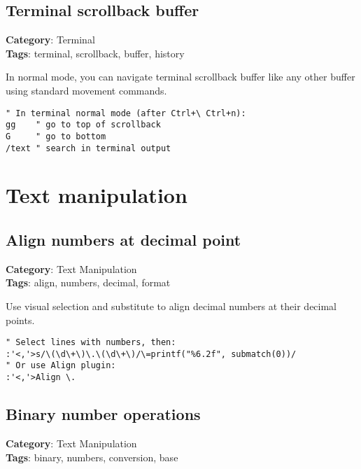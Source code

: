 {{{{{{{{{{{{{\section{Terminal scrollback buffer}

\textbf{Category}: Terminal\\ \textbf{Tags}: terminal, scrollback, buffer, history
\vspace{0.5cm}

In normal mode, you can navigate terminal scrollback buffer like any other buffer using standard movement commands.

\begin{Exa*}{}
\begin{Verbatim}[fontsize=\footnotesize, breaklines, breakanywhere]
" In terminal normal mode (after Ctrl+\ Ctrl+n):
gg    " go to top of scrollback
G     " go to bottom  
/text " search in terminal output
\end{Verbatim}
\end{Exa*}

\chapter{Text manipulation}
\section{Align numbers at decimal point}

\textbf{Category}: Text Manipulation\\ \textbf{Tags}: align, numbers, decimal, format
\vspace{0.5cm}

Use visual selection and substitute to align decimal numbers at their decimal points.

\begin{Exa*}{}
\begin{Verbatim}[fontsize=\footnotesize, breaklines, breakanywhere]
" Select lines with numbers, then:
:'<,'>s/\(\d\+\)\.\(\d\+\)/\=printf("%6.2f", submatch(0))/
" Or use Align plugin:
:'<,'>Align \.
\end{Verbatim}
\end{Exa*}

\section{Binary number operations}

\textbf{Category}: Text Manipulation\\ \textbf{Tags}: binary, numbers, conversion, base
\vspace{0.5cm}

}}}}}}}}}}}}}

